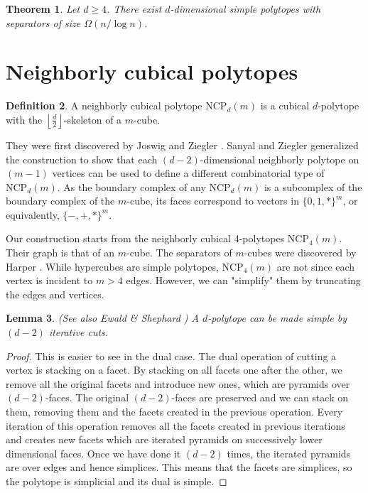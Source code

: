 \documentclass[a4paper,12pt]{book}
\theoremstyle{plain}
\newtheorem{theorem}{Theorem}[section]
\newtheorem{lemma}[theorem]{Lemma}
\theoremstyle{definition}
\newtheorem{definition}[theorem]{Definition}
\newcommand\NC{\textrm{NCP}}
\begin{document}
\begin{theorem}
\label{maintheorem}
 Let $d\geq 4$. There exist $d$-dimensional simple polytopes with
separators of size $\Omega(n/\log n)$.
\end{theorem}

\section{Neighborly cubical polytopes}
\label{ncp}

\begin{definition}
A neighborly cubical polytope $\NC_d(m)$ is a cubical $d$-polytope with the $\left\lfloor \frac{d}{2} 
\right\rfloor$-skeleton of a $m$-cube.
\end{definition}

They were first discovered by Joswig and Ziegler \cite{Z62}. Sanyal and Ziegler \cite{Z102}
generalized the construction to show that each $(d-2)$-dimensional neighborly 
polytope on $(m-1)$ vertices can be used to define a 
different combinatorial type of $\NC_d(m)$. As the boundary complex of any $\NC_d(m)$
is a subcomplex of the boundary complex of the $m$-cube, its faces correspond to vectors
in $\{0,1,*\}^m$, or equivalently, $\{-,+,*\}^m$.


Our construction starts from the neighborly cubical 4-polytopes $\NC_4(m)$. 
Their graph is that of an $m$-cube. The separators of $m$-cubes were discovered by Harper 
\cite{Harp}.
While hypercubes are simple polytopes, $\NC_4(m)$ are not since each vertex is 
incident to $m>4$ edges. However, we can "simplify" them by 
truncating the edges and vertices.

 

\begin{lemma}
(See also Ewald \& Shephard \cite{EwSh}) A $d$-polytope can be made simple 
by $(d-2)$ iterative cuts.
\end{lemma}

\begin{proof}
This is easier to see in the dual case. The dual operation of cutting a vertex 
is stacking on a facet. By stacking on all facets one after the other, we 
remove all the original facets and introduce new ones, which are pyramids over 
$(d-2)$-faces. The original $(d-2)$-faces are preserved and we can stack on 
them, removing them and the facets created in the previous operation. Every 
iteration of this operation removes all the facets created in previous 
iterations and creates new facets which are iterated pyramids on successively 
lower dimensional faces. Once we have done it $(d-2)$ times, the iterated 
pyramids are over edges and hence simplices. This means that the facets are 
simplices, so the polytope is simplicial and its dual is simple.
\end{proof}
\end{document}
